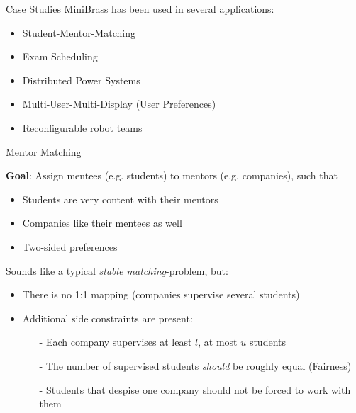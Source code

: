 
\begin{frame}{Case Studies}
MiniBrass has been used in several applications:

\vspace*{2ex}

\begin{itemize}
\item \alert<2->{Student-Mentor-Matching}
\item Exam Scheduling
\item Distributed Power Systems
\item Multi-User-Multi-Display (User Preferences)
\item Reconfigurable robot teams 
\end{itemize}
\end{frame}



\begin{frame}[fragile]{Mentor Matching}

\textbf{Goal}: Assign mentees (e.g. students) to mentors (e.g. companies), such that
\begin{itemize}
\item Students are very content with their mentors
\item Companies like their mentees as well
\item Two-sided preferences
\end{itemize}

\vspace*{2ex}

Sounds like a typical \emph{stable matching}-problem, but:

\begin{itemize}
\item There is no 1:1 mapping (companies supervise several students)
\item Additional side constraints are present:
\begin{itemize}
\item[-] Each company supervises at least $l$, at most $u$ students
\item[-] The number of supervised students \emph{should} be roughly equal (Fairness)
\item[-] Students that despise one company should not be forced to work with them 
\end{itemize}
\end{itemize}
\end{frame}


